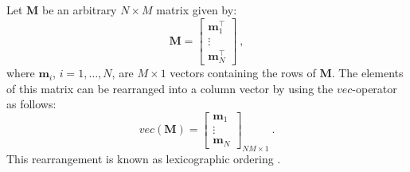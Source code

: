 \documentclass[manuscript,revised]{geophysics}
\begin{document}
Let $\mathbf{M}$ be an arbitrary $N \times M$ matrix given by:
\begin{equation}
\mathbf{M} = \begin{bmatrix}
\mathbf{m}^{\top}_{1} \\ 
\vdots \\
\mathbf{m}^{\top}_{N}
\end{bmatrix} \: ,
\label{eq:matrix-M}
\end{equation}
where $\mathbf{m}_{i}$, $i = 1, \dots, N$, are $M \times 1$ vectors containing 
the rows of $\mathbf{M}$.
The elements of this matrix can be rearranged into a column vector by using the
$vec$-operator \citep[][ p. 31]{jain1989} as follows:
\begin{equation}
vec \left( \mathbf{M} \right) = \begin{bmatrix}
\mathbf{m}_{1} \\
\vdots \\
\mathbf{m}_{N}
\end{bmatrix}_{NM \times 1} \: .
\label{eq:vec-operator}
\end{equation}
This rearrangement is known as lexicographic ordering \citep[][ p. 150]{jain1989}.
\end{document}
